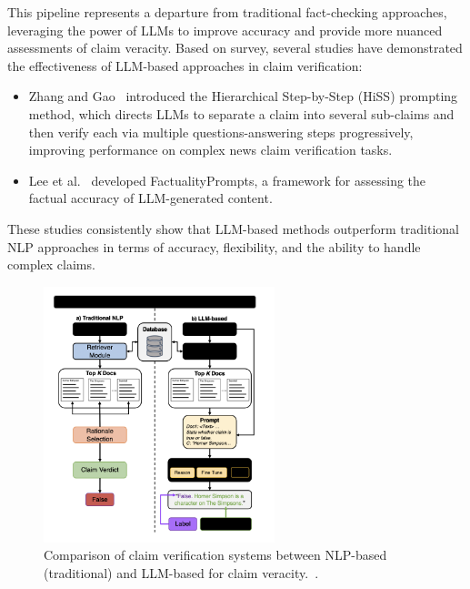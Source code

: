 This pipeline represents a departure from traditional fact-checking approaches, leveraging the power of \ac{LLMs} to improve accuracy and provide more nuanced assessments of claim veracity.
Based on survey, several studies have demonstrated the effectiveness of LLM-based approaches in claim verification:
\begin{itemize}
    \item Zhang and Gao~\cite{zhang2023llmbasedfactverificationnews} introduced the Hierarchical Step-by-Step (HiSS) prompting method, which directs LLMs to separate a claim into several sub-claims and then verify each via multiple questions-answering steps progressively, improving performance on complex news claim verification tasks.
    \item Lee et al.~\cite{lee2023factualityenhancedlanguagemodels} developed FactualityPrompts, a framework for assessing the factual accuracy of LLM-generated content.
\end{itemize}

These studies consistently show that LLM-based methods outperform traditional NLP approaches in terms of accuracy, flexibility, and the ability to handle complex claims.

\begin{figure}[ht!]
    \centering
    \begin{minipage}[b]{\textwidth}
        \centering
        \includegraphics[width=0.6\textwidth]{res/rel-claim-verification}
    \end{minipage}
    \caption{Comparison of claim verification systems between NLP-based (traditional) and LLM-based for claim veracity.~\cite{dmonte2024claimverificationagelarge}.}
    \label{fig:claim-verification-llm}
\end{figure}

